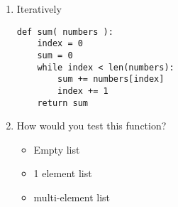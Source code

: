 \documentclass[11pt]{article}
\begin{document}
\begin{enumerate}
\begin{enumerate}
            \item Iteratively
\begin{lstlisting}
def sum( numbers ):
    index = 0
    sum = 0
    while index < len(numbers):
        sum += numbers[index]
        index += 1
    return sum
\end{lstlisting}

            \item How would you test this function?
                \begin{itemize}
                    \item Empty list
                    \item 1 element list
                    \item multi-element list
                \end{itemize}
        \end{enumerate}

\end{enumerate}
\end{document}

